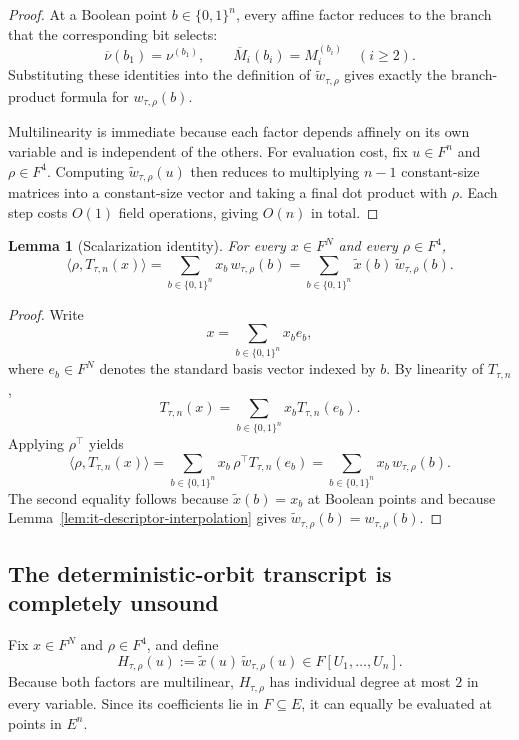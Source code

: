 \documentclass[11pt]{article}
\newtheorem{lemma}[theorem]{Lemma}
\begin{document}
\begin{proof}
At a Boolean point $b\in\{0,1\}^n$, every affine factor reduces to the branch that the corresponding bit selects:
\[
\overline\nu(b_1)=\nu^{(b_1)},
\qquad
\overline M_i(b_i)=M_i^{(b_i)}\quad(i\ge 2).
\]
Substituting these identities into the definition of $\widetilde w_{\tau,\rho}$ gives exactly the branch-product formula for $w_{\tau,\rho}(b)$.

Multilinearity is immediate because each factor depends affinely on its own variable and is independent of the others. For evaluation cost, fix $u\in F^n$ and $\rho\in F^4$. Computing $\widetilde w_{\tau,\rho}(u)$ then reduces to multiplying $n-1$ constant-size matrices into a constant-size vector and taking a final dot product with $\rho$. Each step costs $O(1)$ field operations, giving \(O(n)\) in total.
\end{proof}

\begin{lemma}[Scalarization identity]
\label{lem:it-scalarization}
For every $x\in F^N$ and every $\rho\in F^4$,
\[
\langle \rho,T_{\tau,n}(x)\rangle
=
\sum_{b\in\{0,1\}^n} x_b\,w_{\tau,\rho}(b)
=
\sum_{b\in\{0,1\}^n} \widetilde x(b)\,\widetilde w_{\tau,\rho}(b).
\]
\end{lemma}

\begin{proof}
Write
\[
x=\sum_{b\in\{0,1\}^n} x_b e_b,
\]
where $e_b\in F^N$ denotes the standard basis vector indexed by $b$. By linearity of $T_{\tau,n}$,
\[
T_{\tau,n}(x)=\sum_{b\in\{0,1\}^n} x_b T_{\tau,n}(e_b).
\]
Applying $\rho^\top$ yields
\[
\langle \rho,T_{\tau,n}(x)\rangle
=
\sum_{b\in\{0,1\}^n} x_b\,\rho^\top T_{\tau,n}(e_b)
=
\sum_{b\in\{0,1\}^n} x_b\,w_{\tau,\rho}(b).
\]
The second equality follows because $\widetilde x(b)=x_b$ at Boolean points and because Lemma~\ref{lem:it-descriptor-interpolation} gives $\widetilde w_{\tau,\rho}(b)=w_{\tau,\rho}(b)$.
\end{proof}

\subsection{The deterministic-orbit transcript is completely unsound}

Fix $x\in F^N$ and $\rho\in F^4$, and define
\[
H_{\tau,\rho}(u):=\widetilde x(u)\,\widetilde w_{\tau,\rho}(u)
\in F[U_1,\dots,U_n].
\]
Because both factors are multilinear, $H_{\tau,\rho}$ has individual degree at most $2$ in every variable. Since its coefficients lie in $F\subseteq E$, it can equally be evaluated at points in $E^n$.
\end{document}
